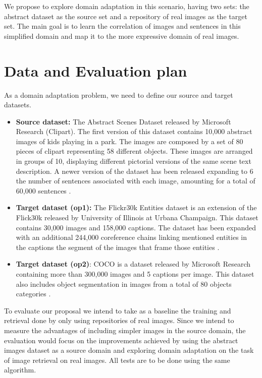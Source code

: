 \documentclass[11pt]{article}
\begin{document}
We propose to explore domain adaptation in this scenario, having two sets: the abstract dataset as the source set and a repository of real images \cite{} as the target set. The main goal is to learn the correlation of images and sentences in this simplified domain and map it to the more expressive domain of real images. 


\section{Data and Evaluation plan}

As a domain adaptation problem, we need to define our source and target datasets. 

\begin{itemize}
\item \textbf{Source dataset:} The Abstract Scenes Dataset released by Microsoft Research (Clipart). The first version of this dataset contains 10,000 abstract images of kids playing in a park. The images are composed by a set of 80 pieces of clipart representing 58 different objects. These images are arranged in groups of 10, displaying different pictorial versions of the same scene text description. A newer version of the dataset has been released expanding to 6 the number of sentences associated with each image, amounting for a total of 60,000 sentences \cite{}. 
\item \textbf{Target dataset (op1):} The Flickr30k Entities dataset is an extension of the Flick30k released by University of Illinois at Urbana Champaign. This dataset contains 30,000 images and 158,000 captions. The dataset has been expanded with an additional 244,000 coreference chains linking mentioned entities in the captions the segment of the images that frame those entities \cite{}. 
\item \textbf{Target dataset (op2)}: COCO is a dataset released by Microsoft Research containing more than 300,000 images and 5 captions per image. This dataset also includes object segmentation in images from a total of 80 objects categories \cite{}. 
\end{itemize}


To evaluate our proposal we intend to take as a baseline the training and retrieval done by only using repositories of real images. Since we intend to measure the advantages of including simpler images in the source domain, the evaluation would focus on the improvements achieved by using the abstract images dataset as a source domain and exploring domain adaptation on the task of image retrieval on real images. All tests are to be done using the same algorithm. 
\end{document}
